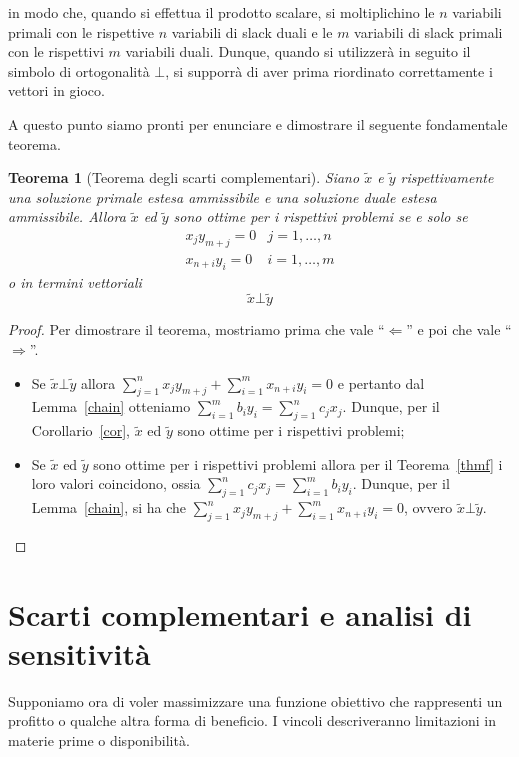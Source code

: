 \documentclass{article}[10pt]
\theoremstyle{theorem}
\newtheorem{theorem}{Teorema}[section]
\theoremstyle{definition}
\theoremstyle{definition}
\theoremstyle{definition}
\begin{document}
	in modo che, quando si effettua il prodotto scalare, si moltiplichino le $n$ variabili primali con le rispettive $n$ variabili di slack duali e le $m$ variabili di slack primali con le rispettivi $m$ variabili duali. Dunque, quando si utilizzerà in seguito il simbolo di ortogonalità $\bot$, si supporrà di aver prima riordinato correttamente i vettori in gioco. 
	
	A questo punto siamo pronti per enunciare e dimostrare il seguente fondamentale teorema.
	
	\begin{theorem}[Teorema degli scarti complementari]
		Siano $\tilde{x}$ e $\tilde{y}$ rispettivamente una soluzione primale estesa ammissibile e una soluzione duale estesa ammissibile. Allora $\tilde{x}$ ed $\tilde{y}$ sono ottime per i rispettivi problemi se e solo se 
		\begin{eqnarray*}
		x_jy_{m+j}=0 & j = 1,\ldots,n \\
		x_{n+i}y_i=0 & i = 1,\ldots,m
		\end{eqnarray*}
		o in termini vettoriali 
		\begin{equation*}
		\tilde{x} \bot \tilde{y}
		\end{equation*}
	\end{theorem}
	\begin{proof}
		Per dimostrare il teorema, mostriamo prima che vale ``$\Leftarrow$'' e poi che vale ``$\Rightarrow$''.
		\begin{itemize}
			\item Se $\tilde{x} \bot \tilde{y}$ allora $\sum_{j=1}^{n}x_jy_{m+j} + \sum_{i=1}^{m}x_{n+i}y_i = 0$ e pertanto dal Lemma~\ref{chain} otteniamo $\sum_{i=1}^{m}b_iy_i = \sum_{j=1}^{n}c_jx_j$. Dunque, per il Corollario~\ref{cor}, $\tilde{x}$ ed $\tilde{y}$ sono ottime per i rispettivi problemi;
			\item Se $\tilde{x}$ ed $\tilde{y}$ sono ottime per i rispettivi problemi allora per il Teorema~\ref{thmf} i loro valori coincidono, ossia $\sum_{j=1}^{n}c_jx_j = \sum_{i=1}^{m}b_iy_i$. Dunque, per il Lemma~\ref{chain}, si ha che $\sum_{j=1}^{n}x_jy_{m+j} + \sum_{i=1}^{m}x_{n+i}y_i = 0$, ovvero $\tilde{x} \bot \tilde{y}$.
		\end{itemize}
	\end{proof}
	
	\section{Scarti complementari e analisi di sensitività}
	Supponiamo ora di voler massimizzare una funzione obiettivo che rappresenti un profitto o qualche altra forma di beneficio. I vincoli descriveranno limitazioni in materie prime o disponibilità.
	
\end{document}
